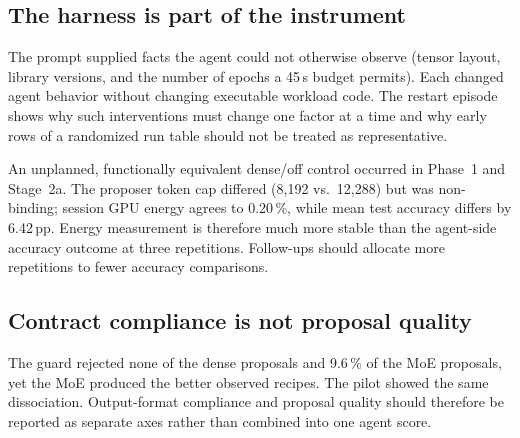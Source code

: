 \subsection{The harness is part of the instrument}

The prompt supplied facts the agent could not otherwise observe (tensor layout,
library versions, and the number of epochs a 45\,s budget permits). Each changed
agent behavior without changing executable workload code. The restart episode
shows why such interventions must change one factor at a time and why early rows
of a randomized run table should not be treated as representative.

An unplanned, functionally equivalent dense/off control occurred in Phase~1 and
Stage~2a. The proposer token cap differed (8,192 vs.\ 12,288) but was non-binding;
session GPU energy agrees to 0.20\,\%, while mean test accuracy differs by
6.42\,pp. Energy measurement is therefore much more stable than the agent-side
accuracy outcome at three repetitions. Follow-ups should allocate more repetitions
to fewer accuracy comparisons.

\subsection{Contract compliance is not proposal quality}

The guard rejected none of the dense proposals and 9.6\,\% of the MoE proposals,
yet the MoE produced the better observed recipes. The pilot showed the same
dissociation. Output-format compliance and proposal quality should therefore be
reported as separate axes rather than combined into one agent score.
